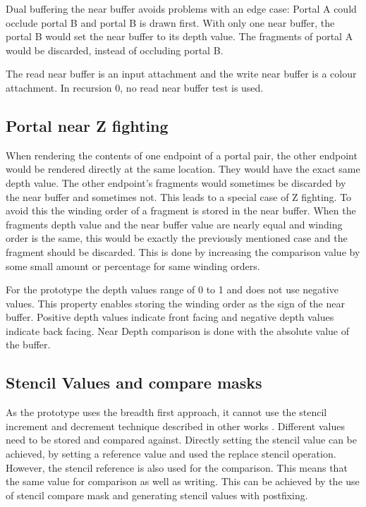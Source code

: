 Dual buffering the near buffer avoids problems with an edge case: Portal A could occlude portal B and portal B is drawn first. With only one near buffer, the portal B would set the near buffer to its depth value. The fragments of portal A would be discarded, instead of occluding portal B.

The read near buffer is an input attachment and the write near buffer is a colour attachment. In recursion 0, no read near buffer test is used.

\subsection{Portal near Z fighting}
\label{section:portalzfighting}
When rendering the contents of one endpoint of a portal pair, the other endpoint would be rendered directly at the same location. They would have the exact same depth value. The other endpoint's fragments would sometimes be discarded by the near buffer and sometimes not. This leads to a special case of Z fighting. To avoid this the winding order of a fragment is stored in the near buffer. When the fragments depth value and the near buffer value are nearly equal and winding order is the same, this would be exactly the previously mentioned case and the fragment should be discarded. This is done by increasing the comparison value by some small amount or percentage for same winding orders.

For the prototype the depth values range of 0 to 1 and does not use negative values. This property enables storing the winding order as the sign of the near buffer. Positive depth values indicate front facing and negative depth values indicate back facing. Near Depth comparison is done with the absolute value of the buffer.

\subsection{Stencil Values and compare masks}
\label{section:stencilcomparemasks}

As the prototype uses the breadth first approach, it cannot use the stencil increment and decrement technique described in other works \cite{schmalstieg:1999:sewing, lowe:2003:fragment, lecture:portalProblems}. Different values need to be stored and compared against. Directly setting the stencil value can be achieved, by setting a reference value and used the replace stencil operation. However, the stencil reference is also used for the comparison. This means that the same value for comparison as well as writing. This can be achieved by the use of stencil compare mask and generating stencil values with postfixing.

